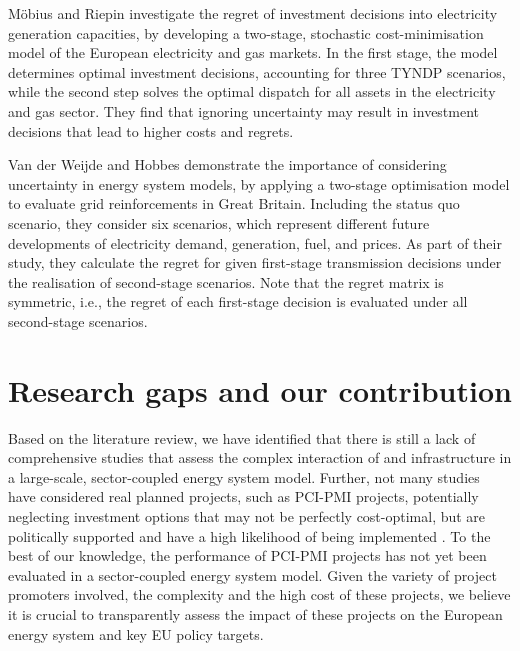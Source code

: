 \documentclass[preprint,12pt,sort&compress]{elsarticle}
\begin{document}
Möbius and Riepin \cite{mobiusRegretAnalysisInvestment2020} investigate the regret of investment decisions into electricity generation capacities, by developing a two-stage, stochastic cost-minimisation model of the European electricity and gas markets. In the first stage, the model determines optimal investment decisions, accounting for three TYNDP scenarios, while the second step solves the optimal dispatch for all assets in the electricity and gas sector. They find that ignoring uncertainty may result in investment decisions that lead to higher costs and regrets. 

Van der Weijde and Hobbes \cite{vanderweijdeEconomicsPlanningElectricity2012} demonstrate the importance of considering uncertainty in energy system models, by applying a two-stage optimisation model to evaluate grid reinforcements in Great Britain. Including the status quo scenario, they consider six scenarios, which represent different future developments of electricity demand, generation, fuel, and  prices. As part of their study, they calculate the regret for given first-stage transmission decisions under the realisation of second-stage scenarios. Note that the regret matrix is symmetric, i.e., the regret of each first-stage decision is evaluated under all second-stage scenarios. 

\section{Research gaps and our contribution}
Based on the literature review, we have identified that there is still a lack of comprehensive studies that assess the complex interaction of  and  infrastructure in a large-scale, sector-coupled energy system model. Further, not many studies have considered real planned projects, such as PCI-PMI projects, potentially neglecting investment options that may not be perfectly cost-optimal, but are politically supported and have a high likelihood of being implemented \cite{greevenbroekLittleLoseCase2024,trutnevyteDoesCostOptimization2016}. To the best of our knowledge, the performance of PCI-PMI projects has not yet been evaluated in a sector-coupled energy system model. Given the variety of project promoters involved, the complexity and the high cost of these projects, we believe it is crucial to transparently assess the impact of these projects on the European energy system and key EU policy targets.
\end{document}
